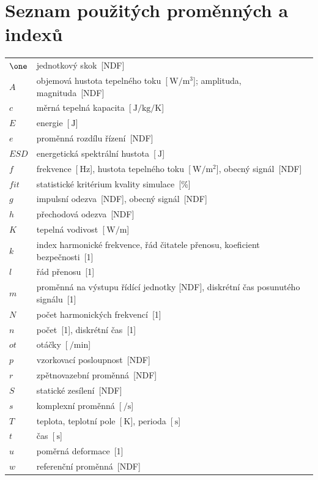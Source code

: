 \chapter*{Seznam použitých proměnných a indexů}

\thispagestyle{plain}
\begin{xltabular}[l]{\linewidth}{@{} lX @{}}
$\one$ & jednotkový skok~[NDF]\\
$A$ & objemová hustota tepelného toku~[$\SI{}{\watt\per\cubic\meter}$]; amplituda, magnituda~[NDF]\\
$c$ & měrná tepelná kapacita~[$\SI{}{\joule\per\kilogram\per\kelvin}$]\\
$E$ & energie~[$\SI{}{\joule}$]\\
$e$ & proměnná rozdílu řízení~[NDF]\\
$ESD$ &energetická spektrální hustota~[$\SI{}{\joule}$]\\
$f$ & frekvence~[$\SI{}{\hertz}$], hustota tepelného toku~[$\SI{}{\watt\per\meter\squared}$], obecný signál~[NDF]\\
$fit$ & statistické kritérium kvality simulace~[\%]\\
$g$ & impulsní odezva~[NDF], obecný signál~[NDF]\\
$h$ & přechodová odezva~[NDF]\\
$K$ & tepelná vodivost~[$\SI{}{\watt\per\meter}$]\\
$k$ & index harmonické frekvence, řád čitatele přenosu, koeficient bezpečnosti~[1]\\
$l$ & řád přenosu~[1]\\
$m$ & proměnná na výstupu řídící jednotky [NDF], diskrétní čas posunutého signálu~[1]\\
$N$ & počet harmonických frekvencí~[1]\\
$n$ & počet~[1], diskrétní čas~[1]\\
$ot$ & otáčky~[$\SI{}{\per\minute}$]\\
$p$ & vzorkovací posloupnost~[NDF]\\
$r$ & zpětnovazební proměnná~[NDF]\\
$S$ & statické zesílení~[NDF]\\
$s$ & komplexní proměnná~[$\SI{}{\per\second}$]\\
$T$ & teplota, teplotní pole~[$\SI{}{\kelvin}$], perioda~[$\SI{}{\second}$]\\
$t$ & čas~[$\SI{}{\second}$]\\
$u$ & poměrná deformace~[1]\\
$w$ & referenční proměnná~[NDF]\\

\end{xltabular}
